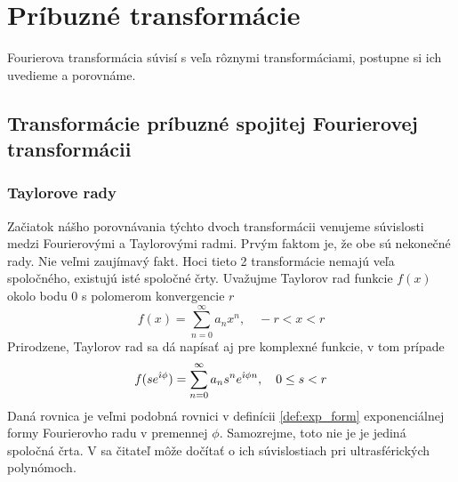 \section{Príbuzné transformácie}

Fourierova transformácia súvisí s veľa rôznymi transformáciami,
postupne si ich uvedieme a porovnáme.

\subsection{Transformácie príbuzné spojitej Fourierovej transformácii}
\subsubsection{Taylorove rady}
Začiatok nášho porovnávania týchto dvoch transformácii venujeme
súvislosti medzi Fourierovými a Taylorovými radmi. Prvým faktom je, že
obe sú nekonečné rady. Nie veľmi zaujímavý fakt. Hoci tieto 2
transformácie nemajú veľa spoločného, existujú isté spoločné črty.
Uvažujme Taylorov rad funkcie $f(x)$ okolo bodu 0 s polomerom konvergencie $r$
\begin{equation*}
    f(x) = \sum_{n=0}^{\infty} a_n x^n, \quad -r < x < r
\end{equation*}
Prirodzene, Taylorov rad sa dá napísať aj pre komplexné funkcie, v tom
prípade
\begin{equation*}
    f(s e^{\hat{\imath} \phi}) = \sum_{n=0}^{\infty} a_n s^n e^{\hat{\imath} \phi n},
        \quad  0 \le s <r
\end{equation*}
Daná rovnica je veľmi podobná rovnici v definícii \ref{def:exp_form} 
exponenciálnej formy Fourierovho radu v premennej $\phi$.
Samozrejme, toto nie je je jediná spoločná črta. V \cite{taylor} sa
čitateľ môže dočítať o ich súvislostiach pri ultrasférických
polynómoch.


